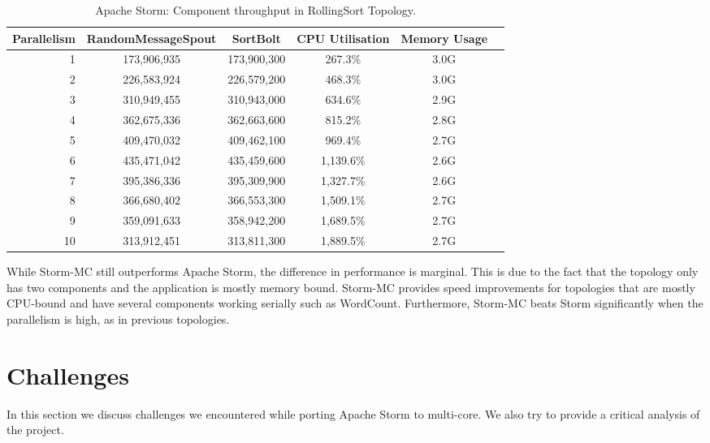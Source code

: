\begin{table}[!htb]
\begin{adjustwidth}{-0.5in}{-0.5in}
\centering
\small
\begin{tabular}{@{}rccccl@{}}
    \textbf{Parallelism} & \textbf{RandomMessageSpout} & \textbf{SortBolt} & \textbf{CPU Utilisation} & \textbf{Memory Usage} \\ \toprule
    1 & {173,906,935} & {173,900,300} & {267.3\%} & {3.0G} \\
    2 & {226,583,924} & {226,579,200} & {468.3\%} & {3.0G} \\
    3 & {310,949,455} & {310,943,000} & {634.6\%} & {2.9G} \\
    4 & {362,675,336} & {362,663,600} & {815.2\%} & {2.8G} \\
    5 & {409,470,032} & {409,462,100} & {969.4\%} & {2.7G} \\
    6 & {435,471,042} & {435,459,600} & {1,139.6\%} & {2.6G} \\
    7 & {395,386,336} & {395,309,900} & {1,327.7\%} & {2.6G} \\
    8 & {366,680,402} & {366,553,300} & {1,509.1\%} & {2.7G} \\
    9 & {359,091,633} & {358,942,200} & {1,689.5\%} & {2.7G} \\
    10 & {313,912,451} & {313,811,300} & {1,889.5\%} & {2.7G} \\
\end{tabular}
\caption{Apache Storm: Component throughput in RollingSort Topology.}
\label{table:storm_rolling}
\end{adjustwidth}
\end{table}

While Storm-MC still outperforms Apache Storm, the difference in performance is marginal. This is due to the fact that the topology only has two components and the application is mostly memory bound. Storm-MC provides speed improvements for topologies that are mostly CPU-bound and have several components working serially such as WordCount. Furthermore, Storm-MC beats Storm significantly when the parallelism is high, as in previous topologies.

\section{Challenges}
\label{sec:challenges}

In this section we discuss challenges we encountered while porting Apache Storm to multi-core. We also try to provide a critical analysis of the project.

